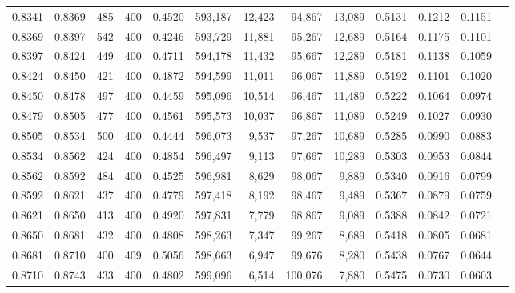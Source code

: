 \begin{tabular}{rrrrrrrrrrrrr}
0.8341 & 0.8369 &    485 & 400 &                                     0.4520 & 593,187 &  12,423 &  94,867 &  13,089 & 0.5131 & 0.1212 & 0.1151 \\
0.8369 & 0.8397 &    542 & 400 &                                     0.4246 & 593,729 &  11,881 &  95,267 &  12,689 & 0.5164 & 0.1175 & 0.1101 \\
0.8397 & 0.8424 &    449 & 400 &                                     0.4711 & 594,178 &  11,432 &  95,667 &  12,289 & 0.5181 & 0.1138 & 0.1059 \\
0.8424 & 0.8450 &    421 & 400 &                                     0.4872 & 594,599 &  11,011 &  96,067 &  11,889 & 0.5192 & 0.1101 & 0.1020 \\
0.8450 & 0.8478 &    497 & 400 &                                     0.4459 & 595,096 &  10,514 &  96,467 &  11,489 & 0.5222 & 0.1064 & 0.0974 \\
0.8479 & 0.8505 &    477 & 400 &                                     0.4561 & 595,573 &  10,037 &  96,867 &  11,089 & 0.5249 & 0.1027 & 0.0930 \\
0.8505 & 0.8534 &    500 & 400 &                                     0.4444 & 596,073 &   9,537 &  97,267 &  10,689 & 0.5285 & 0.0990 & 0.0883 \\
0.8534 & 0.8562 &    424 & 400 &                                     0.4854 & 596,497 &   9,113 &  97,667 &  10,289 & 0.5303 & 0.0953 & 0.0844 \\
0.8562 & 0.8592 &    484 & 400 &                                     0.4525 & 596,981 &   8,629 &  98,067 &   9,889 & 0.5340 & 0.0916 & 0.0799 \\
0.8592 & 0.8621 &    437 & 400 &                                     0.4779 & 597,418 &   8,192 &  98,467 &   9,489 & 0.5367 & 0.0879 & 0.0759 \\
0.8621 & 0.8650 &    413 & 400 &                                     0.4920 & 597,831 &   7,779 &  98,867 &   9,089 & 0.5388 & 0.0842 & 0.0721 \\
0.8650 & 0.8681 &    432 & 400 &                                     0.4808 & 598,263 &   7,347 &  99,267 &   8,689 & 0.5418 & 0.0805 & 0.0681 \\
0.8681 & 0.8710 &    400 & 409 &                                     0.5056 & 598,663 &   6,947 &  99,676 &   8,280 & 0.5438 & 0.0767 & 0.0644 \\
0.8710 & 0.8743 &    433 & 400 &                                     0.4802 & 599,096 &   6,514 & 100,076 &   7,880 & 0.5475 & 0.0730 & 0.0603 \\

\end{tabular}
